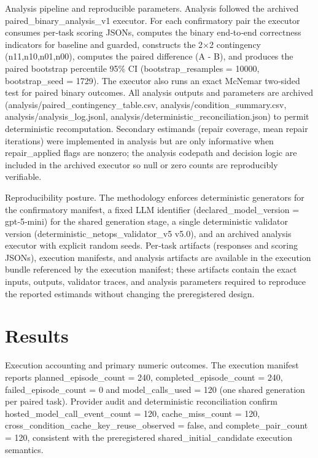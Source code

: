 \documentclass[conference]{IEEEtran}
\begin{document}
Analysis pipeline and reproducible parameters. Analysis followed the archived paired\_binary\_analysis\_v1 executor. For each confirmatory pair the executor consumes per‑task scoring JSONs, computes the binary end‑to‑end correctness indicators for baseline and guarded, constructs the 2\ensuremath{\times}2 contingency (n11,n10,n01,n00), computes the paired difference (A - B), and produces the paired bootstrap percentile 95\% CI (bootstrap\_resamples = 10000, bootstrap\_seed = 1729). The executor also runs an exact McNemar two‑sided test for paired binary outcomes. All analysis outputs and parameters are archived (analysis/paired\_contingency\_table.csv, analysis/condition\_summary.csv, analysis/analysis\_log.jsonl, analysis/deterministic\_reconciliation.json) to permit deterministic recomputation. Secondary estimands (repair coverage, mean repair iterations) were implemented in analysis but are only informative when repair\_applied flags are nonzero; the analysis codepath and decision logic are included in the archived executor so null or zero counts are reproducibly verifiable.

Reproducibility posture. The methodology enforces deterministic generators for the confirmatory manifest, a fixed LLM identifier (declared\_model\_version = gpt‑5‑mini) for the shared generation stage, a single deterministic validator version (deterministic\_netops\_validator\_v5 v5.0), and an archived analysis executor with explicit random seeds. Per‑task artifacts (responses and scoring JSONs), execution manifests, and analysis artifacts are available in the execution bundle referenced by the execution manifest; these artifacts contain the exact inputs, outputs, validator traces, and analysis parameters required to reproduce the reported estimands without changing the preregistered design.

\section{Results}
Execution accounting and primary numeric outcomes. The execution manifest reports planned\_episode\_count = 240, completed\_episode\_count = 240, failed\_episode\_count = 0 and model\_calls\_used = 120 (one shared generation per paired task). Provider audit and deterministic reconciliation confirm hosted\_model\_call\_event\_count = 120, cache\_miss\_count = 120, cross\_condition\_cache\_key\_reuse\_observed = false, and complete\_pair\_count = 120, consistent with the preregistered shared\_initial\_candidate execution semantics.
\end{document}
